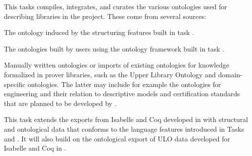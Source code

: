 \begin{workpackage}[id=structuring,type=RTD,
  short={Structure of the encyclopedia},%
  title={Structure of the encyclopedia},
  lead=Sac,
  SacRM=40,
  FauRM=20,
  BolRM=4
]
\begin{tasklist}

\begin{task}[id=strrefonto,title=Reference Ontology,lead=Sac,FauRM=6,SacRM=6,wphases=12-36!.5]
This tasks compiles, integrates, and curates the various ontologies used for describing libraries in the project.
These come from several sources:
\begin{compactitem}
 \item The ontology induced by the structuring features built in task .
 \item The ontologies built by users using the ontology framework built in task .
 \item Manually written ontologies or imports of existing ontologies for knowledge formalized in prover libraries, such as the Upper Library Ontology \cite{CKMRSW:ulo:19} and domain-specific ontologies.
 The latter may include for example the ontologies for engineering and their relation to descriptive models and certification standards that are planned to be developed by .
\end{compactitem}
\end{task}

\begin{task}[id=strontorepml,title=Ontological Representation of Formal Libraries,lead=Fau,FauRM=6,BolRM=4,SacRM=4,wphases=12-48!.5]
This task extends the exports from Isabelle and Coq developed in  with structural and ontological data that conforms to the language features introduced in Tasks~ and .
It will also build on the ontological export of ULO data developed for Isabelle and Coq in \cite{CKMRSW:ulo:19}.


\end{task}
\end{tasklist}
\end{workpackage}
